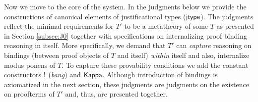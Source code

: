 \documentclass[11pt]{eptcs} %
\begin{document}
{Now we move to the core of the system. In the judgments below we provide the constructions of canonical elements of justificational types (${\sf jtype}$). The judgments reflect  the minimal requirements for $T'$ to be a metatheory of some $T$ as presented  in Section \ref{subsec:J0} together with specifications on internalizing proof binding reasoning in itself. More specifically, we demand that $T'$ can \textit{capture} reasoning on bindings (between proof objects of $T$ and itself) \textit {within} itself and also, internalize modus ponens of $T$.  To capture these provability conditions we add the constant constructors ${\sf !}$ (\textit{bang}) and  ${\sf Kappa}$. Although introduction of bindings is axiomatized in the next section, these judgments are judgments on the existence on proofterms of $T'$ and, thus, are presented together.
%




}
\end{document}
